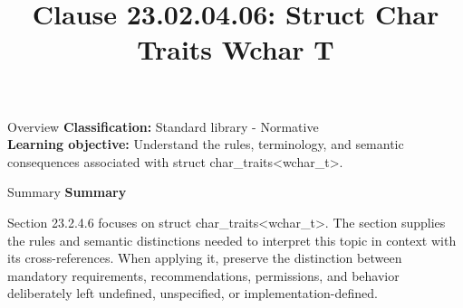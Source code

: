 \documentclass[10pt,letterpaper]{article}
\title{Clause 23.02.04.06: Struct Char Traits Wchar T}
\author{}
\date{}
\begin{document}
\maketitle
\begin{CornellOverviewBox}{Overview}
\textbf{Classification:} Standard library - Normative\\[2pt]
\textbf{Learning objective:} Understand the rules, terminology, and semantic consequences associated with struct char\_traits<wchar\_t>.
\end{CornellOverviewBox}\begin{CornellSummaryBox}{Summary}
{\sffamily\bfseries\color{Accent} Summary}\par\vspace{3pt}Section 23.2.4.6 focuses on struct char\_traits<wchar\_t>. The section supplies the rules and semantic distinctions needed to interpret this topic in context with its cross-references. When applying it, preserve the distinction between mandatory requirements, recommendations, permissions, and behavior deliberately left undefined, unspecified, or implementation-defined.
\end{CornellSummaryBox}
\end{document}
